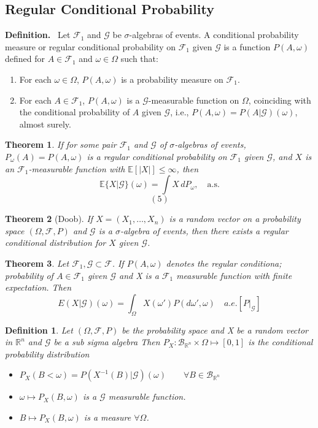 \documentclass{article}
\newtheorem{definition}{Definition}[section]
\newtheorem{theorem}{Theorem}[section]
\begin{document}
\subsection{Regular Conditional Probability}
\textbf{Definition.} \ 
Let \(\mathcal{F}_1\) and \(\mathcal{G}\) be \(\sigma\)-algebras of events. A conditional probability measure or regular conditional probability on \(\mathcal{F}_1\) given \(\mathcal{G}\) is a function \(P(A, \omega)\) defined for \(A \in \mathcal{F}_1\) and \(\omega \in \Omega\) such that:
\begin{enumerate}
    \item For each \(\omega \in \Omega\), \(P(A, \omega)\) is a probability measure on \(\mathcal{F}_1\).
    \item For each \(A \in \mathcal{F}_1\), \(P(A, \omega)\) is a \(\mathcal{G}\)-measurable function on \(\Omega\), coinciding with the conditional probability of \(A\) given \(\mathcal{G}\), i.e., \(P(A, \omega) = P(A | \mathcal{G})(\omega)\), almost surely.
\end{enumerate}
\begin{theorem}
If for some pair \(\mathcal{F}_1\) and \(\mathcal{G}\) of \(\sigma\)-algebras of events, \(P_{\omega}(A) = P(A, \omega)\) is a regular conditional probability on \(\mathcal{F}_1\) given \(\mathcal{G}\), and \(X\) is an \(\mathcal{F}_1\)-measurable function with \(\mathbb{E}[|X|] \leq \infty\), then
\[
\mathbb{E}\{X | \mathcal{G}\}(\omega) = \int X \, dP_{\omega}, \quad \text{a.s.}
\]
\[
(5)
\]
\end{theorem}
\begin{theorem}[Doob]
If \( X = (X_1, \dots, X_n) \) is a random vector on a probability space \((\Omega, \mathcal{F}, P)\) and \(\mathcal{G}\) is a \(\sigma\)-algebra of events, then there exists a regular conditional distribution for \(X\) given \(\mathcal{G}\).
\end{theorem}
\begin{theorem}
    Let $\mathcal{F}_1,\mathcal{G} \subset \mathcal{F} $. If $P(A,\omega)$ denotes the regular conditiona; probability of $A \in \mathcal{F}_1$ given $\mathcal{G} $ and X is a $\mathcal{F}_1$ measurable function with finite expectation. Then \[E(X|\mathcal{G} )(\omega) = \int_{\Omega} X(\omega') P(d\omega',\omega) \quad a.e. [P|_\mathcal{G} ]\]
\end{theorem}
\begin{definition}
    Let $(\Omega,\mathcal{F},P )$ be the probability space and X be a random vector in $\mathbb{R}^n$ and $\mathcal{G} $ be a sub sigma algebra Then $P_X: \mathcal{B}_{\mathbb{R}^n } \times \Omega \mapsto [0,1]$ is the conditional probability distribution 
    \begin{itemize}
        \item $P_X(B<\omega) = P(X^{-1}(B)|\mathcal{G} )(\omega) \qquad \forall B \in \mathcal{B}_{\mathbb{R}^n } $
        \item $\omega \mapsto P_X(B,\omega)$ is a $\mathcal{G} $ measurable function.
        \item  $B \mapsto P_X(B,\omega)$ is a measure $\forall \Omega$.
    \end{itemize}
\end{definition}
\end{document}
